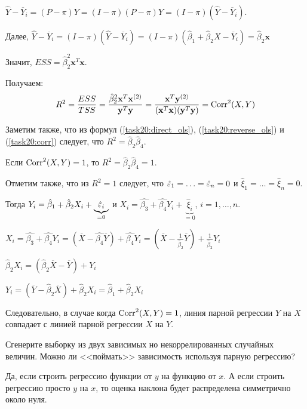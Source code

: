 \documentclass[pdftex,11pt,openany]{book}\usepackage[]{graphicx}\usepackage[]{color}
\begin{document}
\begin{solution}
$\hat{Y} - \overline{Y}_i = (P - \pi)Y = (I - \pi)(P - \pi)Y = (I-\pi)(\hat{Y} - \overline{Y}_i)$.

Далее, $\hat{Y} - \overline{Y}_i = (I - \pi)(\hat{Y} - \overline{Y}_i) = (I - \pi)(\hat{\beta}_1 + \hat{\beta}_2 X - \overline{Y}_i) = \hat{\beta}_2 \textbf{x}$

Значит, $ESS = \hat{\beta}_2^2 \textbf{x}^T \textbf{x}$.

Получаем:
\begin{equation}
\label{task20:corr}R^2 = \frac{ESS}{TSS} = \frac{\hat{\beta}_2^2 \textbf{x}^T \textbf{x}^{(2)}}{\textbf{y}^T \textbf{y}} = \frac{\textbf{x}^T \textbf{y}^{(2)}}{(\textbf{x}^T \textbf{x})(\textbf{y}^T \textbf{y})} = \operatorname{Corr}^2(X, Y)
\end{equation}

Заметим также, что из формул (\ref{task20:direct_ols}), (\ref{task20:reverse_ols}) и (\ref{task20:corr}) следует, что $R^2 = \hat{\beta}_2 \hat{\beta}_4$.

Если $\operatorname{Corr}^2(X, Y) = 1$, то $R^2 = \hat{\beta}_2 \hat{\beta}_4 = 1$.

Отметим также, что из $R^2 = 1$ следует, что $\hat{\varepsilon}_1 = \ldots = \hat{\varepsilon}_n = 0$ и $\hat{\xi}_1 = \ldots = \hat{\xi}_n = 0$.

Тогда $Y_i = \hat{\beta}_1 + \hat{\beta}_2 X_i + \underbrace{\hat{\varepsilon}_i}_{=0}$ и $X_i = \hat{\beta_3} + \hat{\beta_4} Y_i + \underbrace{\hat{\xi}_i}_{=0}$, $i = 1, \ldots, n$.

$X_i = \hat{\beta_3} + \hat{\beta_4} Y_i = (\overline{X} - \hat{\beta_4}\overline{Y}) + \hat{\beta_4} Y_i = \left( \overline{X} - \frac{1}{\hat{\beta}_2} \overline{Y} \right) + \frac{1}{\hat{\beta}_2} Y_i$

$\hat{\beta}_2 X_i = (\hat{\beta}_2 \overline{X} - \overline{Y}) + Y_i$

$Y_i = (\overline{Y} - \hat{\beta}_2 \overline{X}) + \hat{\beta}_2 X_i = \hat{\beta}_1 + \hat{\beta}_2 X_i$

Следовательно, в случае когда $\operatorname{Corr}^2(X, Y) = 1$, линия парной регрессии $Y$ на $X$ совпадает с линией парной регрессии $X$ на $Y$.
\end{solution}



\begin{problem}
Сгенерите выборку из двух зависимых но некоррелированных случайных величин. Можно ли <<поймать>> зависимость используя парную регрессию?
\end{problem}

\begin{solution}
Да, если строить регрессию функции от $y$ на функцию от $x$. А если строить регрессию просто $y$ на $x$, то оценка наклона будет распределена симметрично около нуля.
\end{solution}
\end{document}
